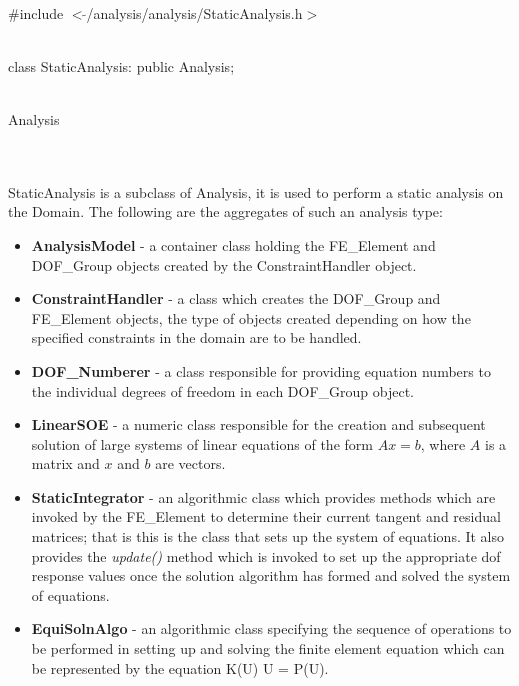 
   \\
\#include $<\tilde{ }$/analysis/analysis/StaticAnalysis.h$>$  


  \\
class StaticAnalysis: public Analysis;  


 \\
Analysis 

\indent{} \\

 \\ 
\indent StaticAnalysis is a subclass of Analysis, it is used to
perform a static analysis on the Domain. The following are the
aggregates of such an analysis type: 
\begin{itemize}
\item {\bf AnalysisModel} - a container class holding the FE\_Element
and DOF\_Group objects created by the ConstraintHandler object. 
\item {\bf ConstraintHandler} - a class which creates the DOF\_Group
and FE\_Element objects, the type of objects created depending on how
the specified constraints in the domain are to be handled. 
\item {\bf DOF\_Numberer} - a class responsible for providing equation
numbers to the individual degrees of freedom in each DOF\_Group object.
\item {\bf LinearSOE} - a numeric class responsible for the creation
and subsequent solution of large systems of linear equations of the
form $Ax = b$, where $A$ is a matrix and $x$ and $b$ are vectors.
\item {\bf StaticIntegrator} - an algorithmic class which provides
methods which are invoked by the FE\_Element to determine their
current tangent and residual matrices; that is this is the class that
sets up the system of equations.  It also provides the {\em
update()} method which is invoked to set up the appropriate dof
response values once the solution algorithm has formed and solved the
system of equations.
\item {\bf EquiSolnAlgo} - an algorithmic class specifying the
sequence of operations to be performed in setting up and solving the
finite element equation which can be represented by the equation K(U)
U = P(U). 
\end{itemize}

